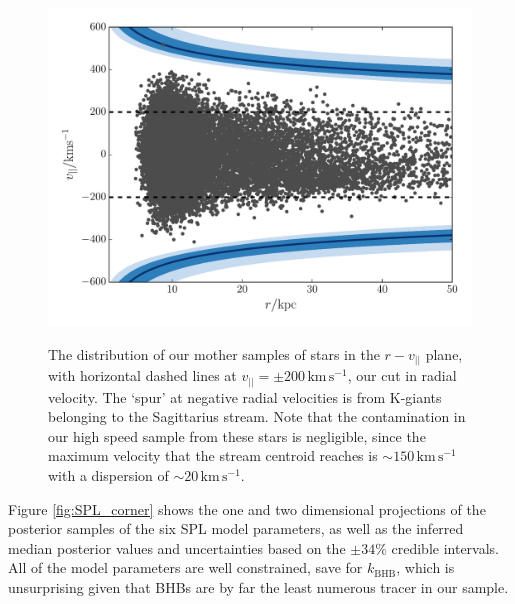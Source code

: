 \documentclass[useAMS,twocolumn,usenatbib]{mn2e}
\def\kms{{\,\mathrm{km\,s^{-1}}}}
\def\vlos{{v_{||}}}
\begin{document}
\begin{figure}
\includegraphics[width=\columnwidth]{plots/stars_bound}\\
\caption{The distribution of our mother samples of stars in the $r-\vlos$ plane, with horizontal dashed lines at $\vlos = \pm 200\kms$, our cut in radial velocity. 
The `spur' at negative radial velocities is from K-giants belonging to the Sagittarius stream. 
Note that the contamination in our high speed sample from these stars is negligible, since the maximum velocity that the stream centroid reaches is $\sim 150\kms$ \citep{Be14} with a dispersion of $\sim 20\kms$.}
\label{fig:stars_bound}
\end{figure}



Figure \ref{fig:SPL_corner} shows the one and two dimensional projections of the posterior samples of the six SPL model parameters, as well as the inferred median posterior values and uncertainties based on the $\pm 34\%$ credible intervals. 
All of the model parameters are well constrained, save for $k_\mathrm{BHB}$, which is unsurprising given that BHBs are by far the least numerous tracer in our sample.
\end{document}
